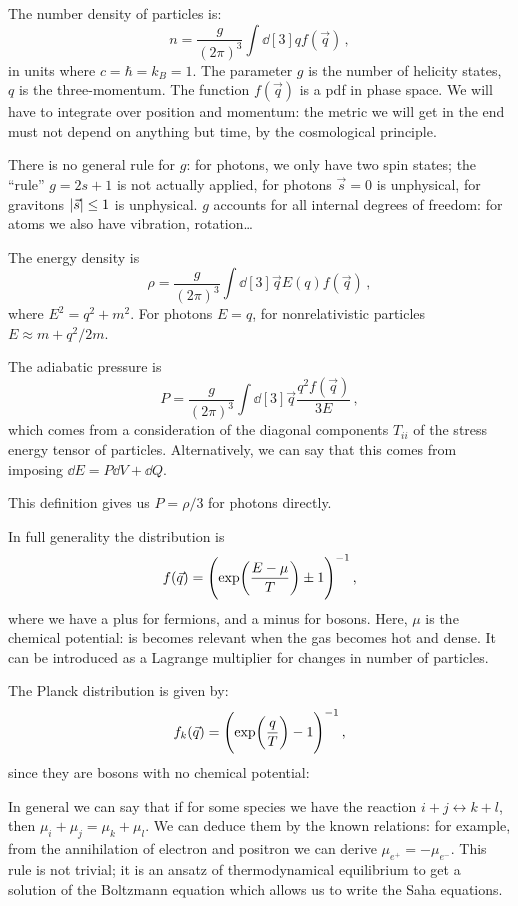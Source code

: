 \documentclass[main.tex]{subfiles}
\begin{document}
The number density of particles is: 
%
\begin{equation}
  n = \frac{g}{(2 \pi )^3} \int \dd[3]{q} f(\vec{q})
\,,
\end{equation}
%
in units where \(c= \hbar = k_B = 1\). The parameter \(g\) is the number of helicity states, \(q\) is the three-momentum. The function \(f(\vec{q})\) is a pdf in phase space.
We will have to integrate  over position and momentum: the metric we will get in the end must not depend on anything but time, by the cosmological principle.

There is no general rule for \(g\): for photons, we only have two spin states; the ``rule'' \(g = 2s +1 \) is not actually applied, for photons \(\vec{s} = 0\) is unphysical, for gravitons \(\abs{\vec{s}} \leq 1 \) is unphysical.
\(g\) accounts for all internal degrees of freedom: for atoms we also have vibration, rotation\dots

The energy density is 
%
\begin{equation}
  \rho = \frac{g}{(2 \pi )^3} \int \dd[3]{\vec{q}} E(q) f(\vec{q}) 
\,,
\end{equation}
%
where \(E^2 = q^2 + m^2\). For photons \(E = q\), for nonrelativistic particles \(E \approx m + q^2 / 2m\).

The adiabatic pressure is 
%
\begin{equation}
  P = \frac{g}{(2 \pi )^3} \int \dd[3]{\vec{q}} \frac{q^2 f(\vec{q})}{3E} 
\,,
\end{equation}
%
which comes from a consideration of the diagonal components \(T_{ii}\) of the stress energy tensor of particles. Alternatively, we can say that this comes from imposing \(\dd{E} = P \dd{V} + \dd{Q} \).

This definition gives us \(P = \rho /3\) for photons directly.

In full generality the distribution is 
%
\begin{equation}
  f(\vec{q}) = \qty(\exp(\frac{E- \mu }{T}) \pm 1 )^{-1}
\,,
\end{equation}
%
where we have a plus for fermions, and a minus for bosons. Here, \(\mu \) is the chemical potential: is becomes relevant when the gas becomes hot and dense.
It can be introduced as a Lagrange multiplier for changes in number of particles.

The Planck distribution is given by: 
%
\begin{equation}
  f_k(\vec{q}) = \qty(\exp(\frac{q}{T}) -1 )^{-1}
\,,
\end{equation}
%
since they are bosons with no chemical potential:

In general we can say that if for some species we have the reaction \(i+j \leftrightarrow k+l\), then \(\mu _i + \mu _j = \mu _k + \mu _l\). We can deduce them by the known relations: for example, from the annihilation of electron and positron we can derive \(\mu _{e^{+}} = - \mu_{e^{-}}\).
This rule is not trivial; it is an ansatz of thermodynamical equilibrium to get a solution of the Boltzmann equation which allows us to write the Saha equations.
\end{document}
